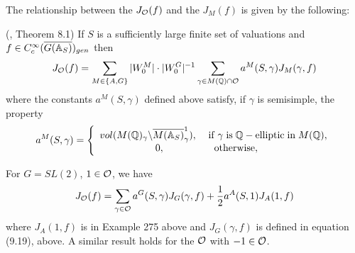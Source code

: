 The relationship between the $J_{{\cal O}}(f)$ and the
$J_M(f)$ is given by the following:

\begin{proposition}
(\cite{A12}, Theorem 8.1) If $S$ is a sufficiently large finite set of
valuations and
$f\in C_c^\infty (\overline{G({\Bbb {A}}_S)})_{gen}$ then 
\[
J_{{\cal O}}(f)=\sum_{M\in \{A,G\}}
|W_0^M|\cdot |W_0^G|^{-1}
\sum_{\gamma \in M({\Bbb {Q}})\cap {\cal{O}}}
a^M(S,\gamma )J_M(\gamma ,f) 
\]
where the constants $a^M(S,\gamma )$ defined above
satisfy, if $\gamma $ is semisimple, the property 
\[
a^M(S,\gamma )=\left\{ 
\begin{array}{c}
vol(M({\Bbb {Q}})_\gamma \backslash \overline{M({\Bbb {A}}_S)}_\gamma ^1),
\;\;\;\;{\rm if\;}\gamma \;{\rm is}\;
{\Bbb {Q}}-{\rm elliptic\;in}\;M({\Bbb {Q}}), \\ 
0,\;\;\;\;\;\;\;\;\;\;\;\;\;\;\;\;\;\;{\rm otherwise},\;\;\;\;\;
\end{array}
\right. 
\]
\end{proposition}

\begin{example} For $G=SL(2)$, $1\in {\cal O}$, we have
\[
J_{\cal O}(f)=\sum_{\gamma\in {\cal{O}}}
a^G(S,\gamma)J_G(\gamma,f)
+{1\over 2}a^A(S,1)J_A(1,f)
\]
where $J_A(1,f)$ is in Example 275 above and $J_G(\gamma,f)$
is defined in equation (9.19), above.
A similar result holds for the ${\cal{O}}$ with $-1\in {\cal{O}}$.
\end{example}


